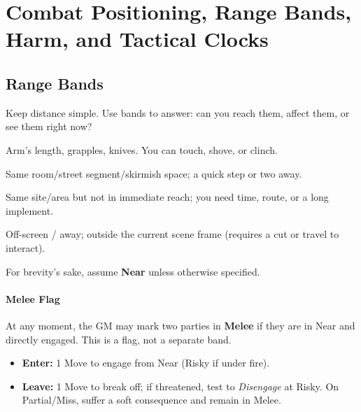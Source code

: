 

\section{Combat Positioning, Range Bands, Harm, and Tactical Clocks}

\subsection{Range Bands}
Keep distance simple. Use bands to answer: can you reach them, affect them, or see them right now?
\begin{description}[leftmargin=1.5em, style=nextline]
  \item[Close] Arm’s length, grapples, knives. You can touch, shove, or clinch.
  \item[Near] Same room/street segment/skirmish space; a quick step or two away.
  \item[Far] Same site/area but not in immediate reach; you need time, route, or a long implement.
  \item[Absent] Off-screen / away; outside the current scene frame (requires a cut or travel to interact).
\end{description}
For brevity’s sake, assume \textbf{Near} unless otherwise specified.

\paragraph{Melee Flag}
At any moment, the GM may mark two parties in \textbf{Melee} if they are in Near and directly engaged. This is a flag, not a separate band.
\begin{itemize}
  \item \textbf{Enter:} 1 Move to engage from Near (Risky if under fire).
  \item \textbf{Leave:} 1 Move to break off; if threatened, test to \emph{Disengage} at Risky. On Partial/Miss, suffer a soft consequence and remain in Melee.
\end{itemize}

